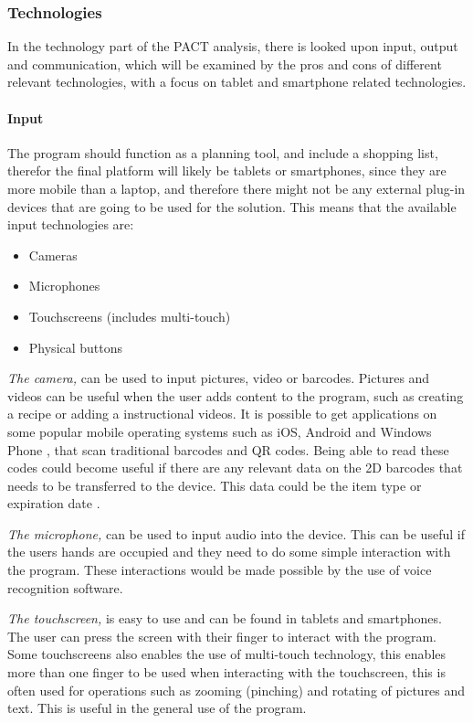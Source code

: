 \subsubsection{Technologies} \label{PACTech}
In the technology part of the PACT analysis, there is looked upon input, output and communication, which will be examined by the pros and cons of different relevant technologies, with a focus on tablet and smartphone related technologies.

\paragraph{Input}
The program should function as a planning tool, and include a shopping list, therefor the final platform will likely be tablets or smartphones, since they are more mobile than a laptop, and therefore there might not be any external plug-in devices that are going to be used for the solution. This means that the available input technologies are:
\begin{itemize}
    \item Cameras
    \item Microphones
    \item Touchscreens (includes multi-touch)
    \item Physical buttons
\end{itemize}

\emph{The camera,} can be used to input pictures, video or barcodes. Pictures and videos can be useful when the user adds content to the program, such as creating a recipe or adding a instructional videos. It is possible to get applications on some popular mobile operating systems such as iOS, Android and Windows Phone \cite{barcode_Phones}, that scan traditional barcodes and QR codes. Being able to read these codes could become useful if there are any relevant data on the 2D barcodes that needs to be transferred to the device. This data could be the item type or expiration date \cite{barcodeInc_FAQ}.           
    
\emph{The microphone,} can be used to input audio into the device. This can be useful if the users hands are occupied and they need to do some simple interaction with the program. These interactions would be made possible by the use of voice recognition software.

\emph{The touchscreen,} is easy to use and can be found in tablets and smartphones. The user can press the screen with their finger to interact with the program. Some touchscreens also enables the use of multi-touch technology, this enables more than one finger to be used when interacting with the touchscreen, this is often used for operations such as zooming (pinching) and rotating of pictures and text. This is useful in the general use of the program.

